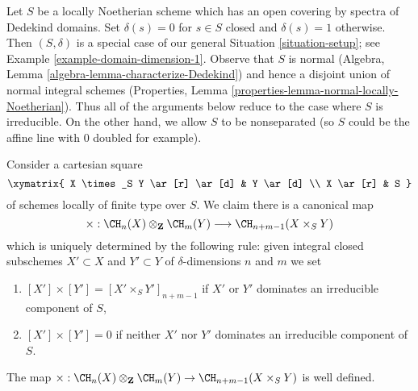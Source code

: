 \noindent
Let $S$ be a locally Noetherian scheme which has an open covering
by spectra of Dedekind domains. Set $\delta(s) = 0$ for $s \in S$ closed
and $\delta(s) = 1$ otherwise. Then $(S, \delta)$ is a special case of our
general Situation \ref{situation-setup}; see
Example \ref{example-domain-dimension-1}.
Observe that $S$ is normal
(Algebra, Lemma \ref{algebra-lemma-characterize-Dedekind})
and hence a disjoint union of normal integral schemes
(Properties, Lemma \ref{properties-lemma-normal-locally-Noetherian}).
Thus all of the arguments below reduce to the case where $S$ is
irreducible. On the other hand, we allow $S$ to be nonseparated (so $S$
could be the affine line with $0$ doubled for example).

\medskip\noindent
Consider a cartesian square
$$
\xymatrix{
X \times_S Y \ar[r] \ar[d] & Y \ar[d] \\
X \ar[r] & S
}
$$
of schemes locally of finite type over $S$. We claim there is a canonical map
$$
\times :
\CH_n(X) \otimes_{\mathbf{Z}} \CH_m(Y)
\longrightarrow
\CH_{n + m - 1}(X \times_S Y)
$$
which is uniquely determined by the following rule:
given integral closed subschemes $X' \subset X$
and $Y' \subset Y$ of $\delta$-dimensions $n$ and $m$ we set
\begin{enumerate}
\item $[X'] \times [Y'] = [X' \times_S Y']_{n + m - 1}$ if
$X'$ or $Y'$ dominates an irreducible component of $S$,
\item $[X'] \times [Y'] = 0$ if neither $X'$ nor $Y'$ dominates an
irreducible component of $S$.
\end{enumerate}

\begin{lemma}
\label{lemma-exterior-product-well-defined-dim-1}
The map $\times : \CH_n(X) \otimes_{\mathbf{Z}} \CH_m(Y) \to
\CH_{n + m - 1}(X \times_S Y)$ is well defined.
\end{lemma}

